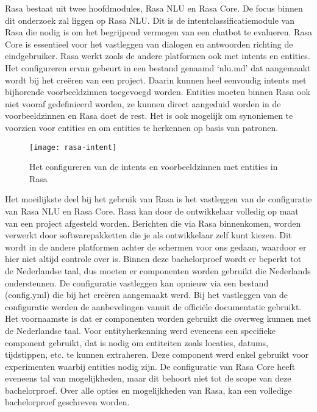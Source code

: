 Rasa bestaat uit twee hoofdmodules, Rasa NLU en Rasa Core. De focus binnen dit onderzoek zal liggen op Rasa NLU. Dit is de intentclassificatiemodule van Rasa die nodig is om het begrijpend vermogen van een chatbot te evalueren. Rasa Core is essentieel voor het vastleggen van dialogen en antwoorden richting de eindgebruiker. Rasa werkt zoals de andere platformen ook met intents en entities. Het configureren ervan gebeurt in een bestand genaamd ‘nlu.md’ dat aangemaakt wordt bij het creëren van een project. Daarin kunnen heel eenvoudig intents met bijhorende voorbeeldzinnen toegevoegd worden. Entities moeten binnen Rasa ook niet vooraf gedefinieerd worden, ze kunnen direct aangeduid worden in de voorbeeldzinnen en Rasa doet de rest. Het is ook mogelijk om synoniemen te voorzien voor entities en om entities te herkennen op basis van patronen.

\begin{figure}[H]
    \label{fig:rasa-intent}
    \centering
    \texttt{[image: rasa-intent]}
    \caption{Het configureren van de intents en voorbeeldzinnen met entities in Rasa}
\end{figure}

Het moeilijkste deel bij het gebruik van Rasa is het vastleggen van de configuratie van Rasa NLU en Rasa Core. Rasa kan door de ontwikkelaar volledig op maat van een project afgesteld worden. Berichten die via Rasa binnenkomen, worden verwerkt door softwarepakketten die je als ontwikkelaar zelf kunt kiezen. Dit wordt in de andere platformen achter de schermen voor ons gedaan, waardoor er hier niet altijd controle over is. Binnen deze bachelorproef wordt er beperkt tot de Nederlandse taal, dus moeten er componenten worden gebruikt die Nederlands ondersteunen. De configuratie vastleggen kan opnieuw via een bestand (config.yml) die bij het creëren aangemaakt werd. Bij het vastleggen van de configuratie werden de aanbevelingen vanuit de officiële documentatie gebruikt. Het voornaamste is dat er componenten worden gebruikt die overweg kunnen met de Nederlandse taal. Voor entityherkenning werd eveneens een specifieke component gebruikt, dat is nodig om entiteiten zoals locaties, datums, tijdstippen, etc. te kunnen extraheren. Deze component werd enkel gebruikt voor experimenten waarbij entities nodig zijn. De configuratie van Rasa Core heeft eveneens tal van mogelijkheden, maar dit behoort niet tot de scope van deze bachelorproef. Over alle opties en mogelijkheden van Rasa, kan een volledige bachelorproef geschreven worden. 


